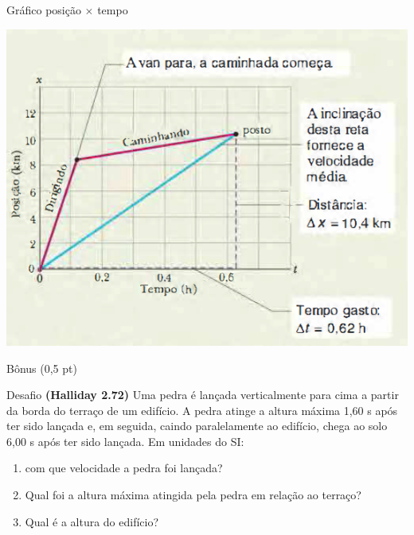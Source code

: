 \documentclass[xcolor=dvipsnames,table]{beamer}
\begin{document}
	\begin{frame}{Gráfico posição $\times$ tempo}
		\begin{center}
			\includegraphics[scale=0.5]{images/fig2-5}
		\end{center}
	\end{frame}
	
	\begin{frame}{Bônus (0,5 pt)}
		\begin{block}{Desafio}
			{\bf (Halliday 2.72)} Uma pedra é lançada verticalmente para cima a partir da borda do terraço de um edifício. A pedra atinge a altura máxima 1,60 s após ter sido lançada e, em seguida, caindo paralelamente ao edifício, chega ao solo 6,00 s após ter sido lançada. Em unidades do SI:
			\begin{enumerate}
				\item com que velocidade a pedra foi lançada? 
				\item Qual foi a altura máxima atingida pela pedra em relação ao terraço? 
				\item Qual é a altura do edifício?
			\end{enumerate}
		\end{block}
	\end{frame}
	
	\begin{frame}
		\titlepage
	\end{frame}
	
\end{document}
